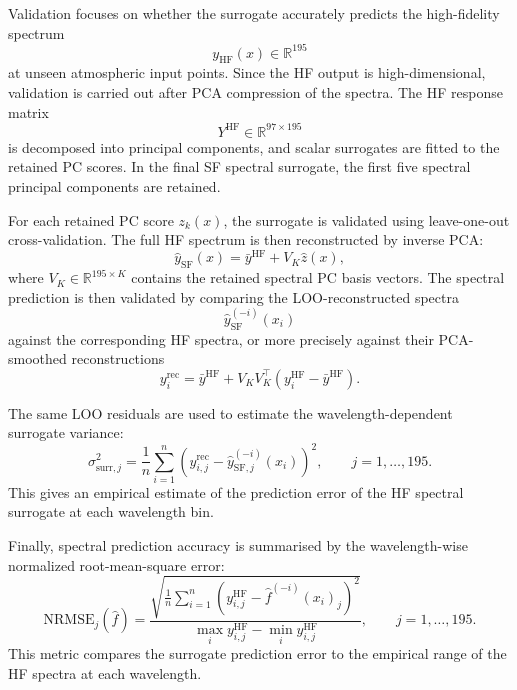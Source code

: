 \documentclass[11pt,a4paper]{article}
\begin{document}
Validation focuses on whether the surrogate accurately predicts the
high-fidelity spectrum
\[
y_{\mathrm{HF}}(x)\in\mathbb R^{195}
\]
at unseen atmospheric input points. Since the HF output is high-dimensional,
validation is carried out after PCA compression of the spectra. The HF
response matrix
\[
Y^{\mathrm{HF}}\in\mathbb R^{97\times 195}
\]
is decomposed into principal components, and scalar surrogates are fitted to
the retained PC scores. In the final SF spectral surrogate, the first five
spectral principal components are retained. 

For each retained PC score \(z_k(x)\), the surrogate is validated using
leave-one-out cross-validation. The full HF spectrum is then reconstructed
by inverse PCA:
\[
\hat y_{\mathrm{SF}}(x)
=
\bar y^{\mathrm{HF}}
+
V_K \hat z(x),
\]
where \(V_K\in\mathbb R^{195\times K}\) contains the retained spectral PC
basis vectors. The spectral prediction is then validated by comparing the
LOO-reconstructed spectra
\[
\hat y_{\mathrm{SF}}^{(-i)}(x_i)
\]
against the corresponding HF spectra, or more precisely against their
PCA-smoothed reconstructions
\[
y_i^{\mathrm{rec}}
=
\bar y^{\mathrm{HF}}
+
V_KV_K^\top
\left(y_i^{\mathrm{HF}}-\bar y^{\mathrm{HF}}\right).
\]

The same LOO residuals are used to estimate the wavelength-dependent
surrogate variance:
\[
\sigma^2_{\mathrm{surr},j}
=
\frac{1}{n}
\sum_{i=1}^{n}
\left(
y^{\mathrm{rec}}_{i,j}
-
\hat y_{\mathrm{SF},j}^{(-i)}(x_i)
\right)^2,
\qquad
j=1,\dots,195.
\]
This gives an empirical estimate of the prediction error of the HF spectral
surrogate at each wavelength bin.

Finally, spectral prediction accuracy is summarised by the wavelength-wise
normalized root-mean-square error:
\[
\mathrm{NRMSE}_j(\hat f)
=
\frac{
\sqrt{
\frac{1}{n}
\sum_{i=1}^{n}
\left(
y^{\mathrm{HF}}_{i,j}
-
\hat f^{(-i)}(x_i)_j
\right)^2
}
}{
\max_i y^{\mathrm{HF}}_{i,j}
-
\min_i y^{\mathrm{HF}}_{i,j}
},
\qquad
j=1,\dots,195.
\]
This metric compares the surrogate prediction error to the empirical range
of the HF spectra at each wavelength. 
\end{document}
